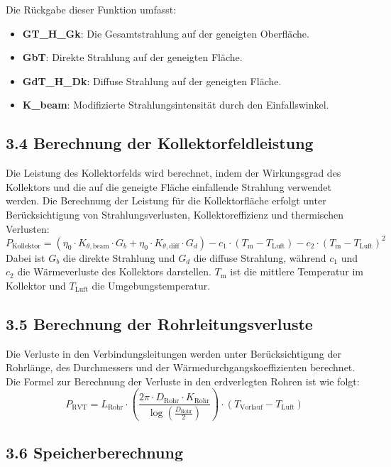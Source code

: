 \documentclass{article}
\begin{document}
Die Rückgabe dieser Funktion umfasst:
\begin{itemize}
    \item \textbf{GT\_H\_Gk}: Die Gesamtstrahlung auf der geneigten Oberfläche.
    \item \textbf{GbT}: Direkte Strahlung auf der geneigten Fläche.
    \item \textbf{GdT\_H\_Dk}: Diffuse Strahlung auf der geneigten Fläche.
    \item \textbf{K\_beam}: Modifizierte Strahlungsintensität durch den Einfallswinkel.
\end{itemize}

\subsection*{3.4 Berechnung der Kollektorfeldleistung}

Die Leistung des Kollektorfelds wird berechnet, indem der Wirkungsgrad des Kollektors und die auf die geneigte Fläche einfallende Strahlung verwendet werden. Die Berechnung der Leistung für die Kollektorfläche erfolgt unter Berücksichtigung von Strahlungsverlusten, Kollektoreffizienz und thermischen Verlusten:
\[
P_{\text{Kollektor}} = \left( \eta_0 \cdot K_{\theta,\text{beam}} \cdot G_b + \eta_0 \cdot K_{\theta,\text{diff}} \cdot G_d \right) - c_1 \cdot (T_{\text{m}} - T_{\text{Luft}}) - c_2 \cdot (T_{\text{m}} - T_{\text{Luft}})^2
\]
Dabei ist \( G_b \) die direkte Strahlung und \( G_d \) die diffuse Strahlung, während \( c_1 \) und \( c_2 \) die Wärmeverluste des Kollektors darstellen. \( T_{\text{m}} \) ist die mittlere Temperatur im Kollektor und \( T_{\text{Luft}} \) die Umgebungstemperatur.

\subsection*{3.5 Berechnung der Rohrleitungsverluste}

Die Verluste in den Verbindungsleitungen werden unter Berücksichtigung der Rohrlänge, des Durchmessers und der Wärmedurchgangskoeffizienten berechnet. Die Formel zur Berechnung der Verluste in den erdverlegten Rohren ist wie folgt:
\[
P_{\text{RVT}} = L_{\text{Rohr}} \cdot \left( \frac{2 \pi \cdot D_{\text{Rohr}} \cdot K_{\text{Rohr}}}{\log\left( \frac{D_{\text{Rohr}}}{2} \right)} \right) \cdot (T_{\text{Vorlauf}} - T_{\text{Luft}})
\]

\subsection*{3.6 Speicherberechnung}
\end{document}
